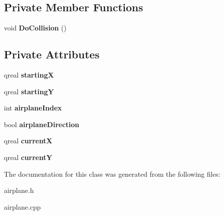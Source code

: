 \subsection*{Private Member Functions}
\begin{DoxyCompactItemize}
\item 
\hypertarget{classairplane_ab2059897bc016de2a94544ba431e9d55}{void {\bfseries Do\-Collision} ()}\label{classairplane_ab2059897bc016de2a94544ba431e9d55}

\end{DoxyCompactItemize}
\subsection*{Private Attributes}
\begin{DoxyCompactItemize}
\item 
\hypertarget{classairplane_a5b8f70eba65f453aac157b764a340fef}{qreal {\bfseries starting\-X}}\label{classairplane_a5b8f70eba65f453aac157b764a340fef}

\item 
\hypertarget{classairplane_aa83b58f1d1af21227b2c8f8d7c71f13f}{qreal {\bfseries starting\-Y}}\label{classairplane_aa83b58f1d1af21227b2c8f8d7c71f13f}

\item 
\hypertarget{classairplane_a2bc5817b9956907ad0bf28ac1fdf1d9d}{int {\bfseries airplane\-Index}}\label{classairplane_a2bc5817b9956907ad0bf28ac1fdf1d9d}

\item 
\hypertarget{classairplane_a00664025b42e62b75c42f73025d6efe7}{bool {\bfseries airplane\-Direction}}\label{classairplane_a00664025b42e62b75c42f73025d6efe7}

\item 
\hypertarget{classairplane_a242659249e39d6f4c9dfc7118785724f}{qreal {\bfseries current\-X}}\label{classairplane_a242659249e39d6f4c9dfc7118785724f}

\item 
\hypertarget{classairplane_a1f5fa4aacea7cd4e81e2b881de1e1f4b}{qreal {\bfseries current\-Y}}\label{classairplane_a1f5fa4aacea7cd4e81e2b881de1e1f4b}

\end{DoxyCompactItemize}


The documentation for this class was generated from the following files\-:\begin{DoxyCompactItemize}
\item 
airplane.\-h\item 
airplane.\-cpp\end{DoxyCompactItemize}
